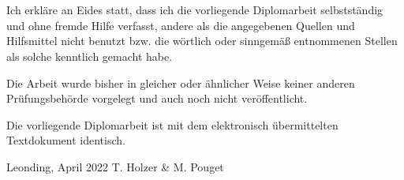 \thispagestyle{empty}
\vspace{3cm}
~ \\ \\
Ich erkläre an Eides statt, dass ich die vorliegende Diplomarbeit selbstständig und ohne fremde Hilfe verfasst, andere als die angegebenen Quellen und Hilfsmittel nicht benutzt bzw. die wörtlich oder sinngemäß entnommenen Stellen als solche kenntlich gemacht habe.

Die Arbeit wurde bisher in gleicher oder ähnlicher Weise keiner anderen Prüfungsbehörde vorgelegt und auch noch nicht veröffentlicht.

Die vorliegende Diplomarbeit ist mit dem elektronisch übermittelten Textdokument identisch.
\vspace{3cm}
\begin{tabbing}
Leonding, April 2022 \hspace{5cm} T. Holzer \& M. Pouget
\end{tabbing}
\vspace{10cm}
\newpage
\setcounter{page}{1}

